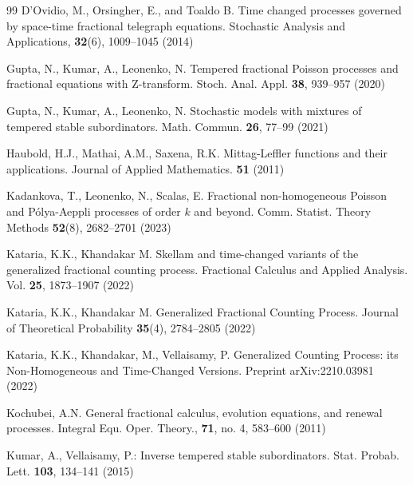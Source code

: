 \documentclass[12pt]{article}
\theoremstyle{definition}
\theoremstyle{plain}
\begin{document}
\begin{thebibliography}{99}
D'Ovidio, M.,  Orsingher, E., and  Toaldo B. Time changed processes governed by space-time fractional telegraph equations.  Stochastic Analysis and Applications, {\bf 32}(6), 1009--1045 (2014)


Gupta, N., Kumar, A., Leonenko, N. Tempered fractional Poisson processes and fractional equations with Z-transform. Stoch. Anal. Appl. {\bf 38}, 939--957 (2020)

Gupta, N., Kumar, A., Leonenko, N. Stochastic models with mixtures of tempered stable subordinators. Math. Commun. {\bf 26}, 77--99 (2021)


 Haubold, H.J., Mathai, A.M., Saxena, R.K. Mittag-Leffler functions and their applications. Journal of Applied Mathematics. {\bf51} (2011)

 Kadankova, T., Leonenko, N., Scalas, E.  Fractional non-homogeneous Poisson
and P\'olya-Aeppli processes of order $k$ and beyond. Comm. Statist. Theory Methods {\bf52}(8), 2682--2701 (2023)

Kataria, K.K., Khandakar M. Skellam and time-changed variants of the generalized fractional counting process. Fractional Calculus and Applied Analysis. Vol. {\bf25}, 1873--1907 (2022)

Kataria, K.K., Khandakar M. Generalized Fractional Counting Process. Journal of Theoretical Probability {\bf35}(4), 2784--2805  (2022)

Kataria, K.K., Khandakar, M., Vellaisamy, P. Generalized Counting Process: its Non-Homogeneous and Time-Changed Versions. Preprint arXiv:2210.03981 (2022)



  Kochubei, A.N.  {General fractional calculus, evolution equations, and renewal processes}. { Integral Equ. Oper. Theory}., {\bf71}, no. 4,  583--600 (2011) 
  
  Kumar, A., Vellaisamy, P.: Inverse tempered stable subordinators. Stat. Probab. Lett. {\bf103}, 134--141 (2015)
  



\end{thebibliography}
\end{document}
